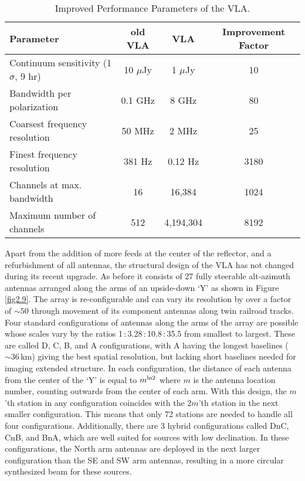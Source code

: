 \begin{table}
\begin{center}
\caption[Improved Performance Parameters of the VLA]
{Improved Performance Parameters of the VLA.}
\begin{tabular}{lccc}
\hline
\hline
\rule{0pt}{2.5ex}Parameter & old VLA & VLA & Improvement Factor \\
\hline
\rule{0pt}{2.5ex}Continuum sensitivity (1$\sigma$, 9 hr) & 10 $\mu$Jy & 1 $\mu$Jy& 10\\
Bandwidth per polarization & 0.1 GHz & 8 GHz & 80\\ 
Coarsest frequency resolution & 50 MHz & 2 MHz & 25\\ 
Finest frequency resolution & 381 Hz & 0.12 Hz & 3180\\ 
Channels at max. bandwidth & 16 & 16,384 & 1024\\ 
Maximum number of channels & 512 & 4,194,304 & 8192\\ 
\hline
\end{tabular}
\label{tab:3.5}
\end{center}
\end{table}

Apart from the addition of more feeds at the center of the reflector, and a refurbishment of all antennas, the structural design of the VLA has not changed during its recent upgrade. As before it consists of 27 fully steerable alt-azimuth antennas arranged along the arms of an upside-down `Y' as shown in Figure \ref{fig2.9}.  The array is re-configurable and can vary its resolution by over a factor of $\sim 50$ through movement of its component antennas along twin railroad tracks. Four standard configurations of antennas along the arms of the array are possible whose scales vary by the ratios 1\,:\,3.28\,:\,10.8\,:\,35.5 from smallest to largest. These are called D, C, B, and A configurations, with A having the longest baselines ($\sim 36$\,km) giving the best spatial resolution, but lacking short baselines needed for imaging extended structure. In each configuration, the distance of each antenna from the center of the `Y' is equal to $m^{\rm{ln}2}$ where $m$ is the antenna location number, counting outwards from the center of each arm. With this design, the $m$'th station in any configuration coincides with the 2$m$'th station in the next smaller configuration. This means that only 72 stations are needed to handle all four configurations. Additionally, there are 3 hybrid configurations called DnC, CnB, and BnA, which are well suited for sources with low declination. In these configurations, the North arm antennas are deployed in the next larger configuration than the SE and SW arm antennas, resulting in a more circular synthesized beam for these sources.

